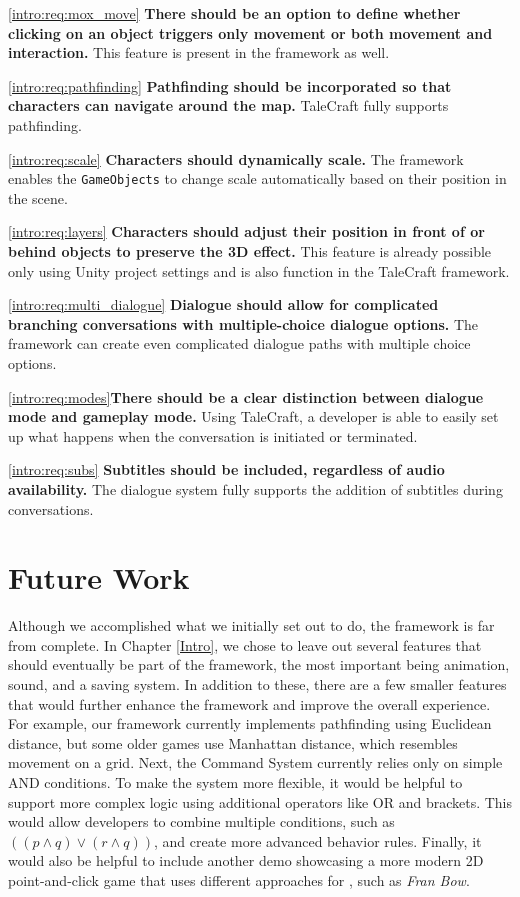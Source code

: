 \ref{intro:req:mox_move} \quad  \textbf{There should be an option to define whether clicking on an object triggers only movement or both movement and interaction.} This feature is present in the framework as well.

\ref{intro:req:pathfinding} \quad  \textbf{Pathfinding should be incorporated so that characters can navigate around the map.} TaleCraft fully supports pathfinding.

\ref{intro:req:scale} \quad  \textbf{Characters should dynamically scale.} The framework enables the \verb|GameObjects| to change scale automatically based on their position in the scene.
 
\ref{intro:req:layers} \quad  \textbf{Characters should adjust their position in front of or behind objects to preserve the 3D effect.} This feature is already possible only using Unity project settings and is also function in the TaleCraft framework.

\ref{intro:req:multi_dialogue} \quad  \textbf{Dialogue should allow for complicated branching conversations with multiple-choice dialogue options.} The framework can create even complicated dialogue paths with multiple choice options.

\ref{intro:req:modes}\quad  \textbf{There should be a clear distinction between dialogue mode and gameplay mode.} Using TaleCraft, a developer is able to easily set up what happens when the conversation is initiated or terminated.

\ref{intro:req:subs} \quad  \textbf{Subtitles should be included, regardless of audio availability.} The dialogue system fully supports the addition of subtitles during conversations.


\section{Future Work}
Although we accomplished what we initially set out to do, the framework is far from complete. In Chapter \ref{Intro}, we chose to leave out several features that should eventually be part of the framework, the most important being animation, sound, and a saving system. In addition to these, there are a few smaller features that would further enhance the framework and improve the overall experience. For example, our framework currently implements pathfinding using Euclidean distance, but some older games use Manhattan distance, which resembles movement on a grid. Next, the Command System currently relies only on simple AND conditions. To make the system more flexible, it would be helpful to support more complex logic using additional operators like OR and brackets. This would allow developers to combine multiple conditions, such as $((p \wedge q) \vee (r \wedge q))$, and create more advanced behavior rules.  Finally, it would also be helpful to include another demo showcasing a more modern 2D point-and-click game that uses different approaches for , such as \textit{Fran Bow}. 
